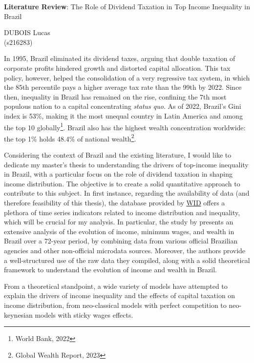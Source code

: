 \documentclass[11pt,a4paper]{article}
\begin{document}
\begin{center}
    \begin{spacing}{1.75}
        {\LARGE \textbf{Literature Review}: The Role of Dividend Taxation in Top Income Inequality in Brazil}
        \vspace{0.25cm}
    \end{spacing}
    \large{DUBOIS Lucas}\\
    (s216283)
\end{center}
\hspace{1cm}In 1995, Brazil eliminated its dividend taxes, arguing that double taxation of corporate profits hindered growth and distorted capital allocation.
This tax policy, however, helped the consolidation of a very regressive tax system, in which the 85th percentile pays a higher average tax rate than the 99th by 2022. 
Since then, inequality in Brazil has remained on the rise, confining the 7th most populous nation to a capital concentrating \textit{status quo}. 
As of 2022, Brazil's Gini index is 53\%, making it the most unequal country in Latin America and among the top 10 globally\footnote{World Bank, 2022}.
Brazil also has the highest wealth concentration worldwide: the top 1\% holds 48.4\% of national wealth\footnote{Global Wealth Report, 2023}.
\par
Considering the context of Brazil and the existing literature, I would like to dedicate my master’s thesis to understanding the drivers of top-income inequality in Brazil, with a particular focus on the role of dividend taxation in shaping income distribution.
The objective is to create a solid quantitative approach to contribute to this subject.
In first instance, regarding the availability of data (and therefore feasibility of this thesis), the database provided by \href{https://wid.world/country/brazil/}{WID} offers a plethora of time series indicators related to income distribution and inequality, which will be crucial for my analysis.
In particular, the study by \cite{morgan2025distribution} presents an extensive analysis of the evolution of income, minimum wages, and wealth in Brazil over a 72-year period, by combining data from various official Brazilian agencies and other non-official microdata sources.
Moreover, the authors provide a well-structured use of the raw data they compiled, along with a solid theoretical framework to understand the evolution of income and wealth in Brazil.
\par
From a theoretical standpoint, a wide variety of models have attempted to explain the drivers of income inequality and the effects of capital taxation on income distribution, from neo-classical models with perfect competition to neo-keynesian models with sticky wages effects.
\end{document}
